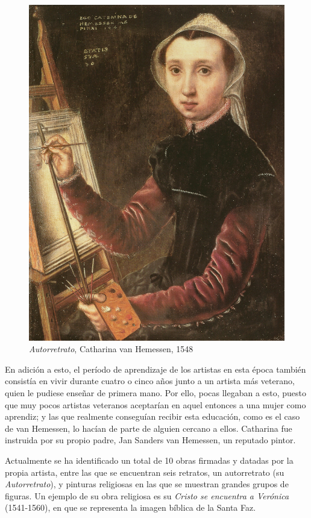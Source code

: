 \documentclass[12pt]{report}
\begin{document}
\begin{figure}
	\begin{center}
		\includegraphics[width=0.9\linewidth]{self-portrait}
		\caption{\textit{Autorretrato}, Catharina van Hemessen, 1548}
		\label{fig:wrapfig}
	\end{center}
\end{figure}

En adición a esto, el período de aprendizaje de los artistas en esta época también consistía en vivir durante cuatro o cinco años junto a un artista más veterano, quien le pudiese enseñar de primera mano. Por ello, pocas llegaban a esto, puesto que muy pocos artistas veteranos aceptarían en aquel entonces a una mujer como aprendiz; y las que realmente conseguían recibir esta educación, como es el caso de van Hemessen, lo hacían de parte de alguien cercano a ellos. Catharina fue instruida por su propio padre, Jan Sanders van Hemessen, un reputado pintor.\bigskip

Actualmente se ha identificado un total de 10 obras firmadas y datadas por la propia artista, entre las que se encuentran seis retratos, un autorretrato (su \textit{Autorretrato}), y pinturas religiosas en las que se muestran grandes grupos de figuras. Un ejemplo de su obra religiosa es su \textit{Cristo se encuentra a Verónica} (1541-1560), en que se representa la imagen bíblica de la Santa Faz.
\end{document}
